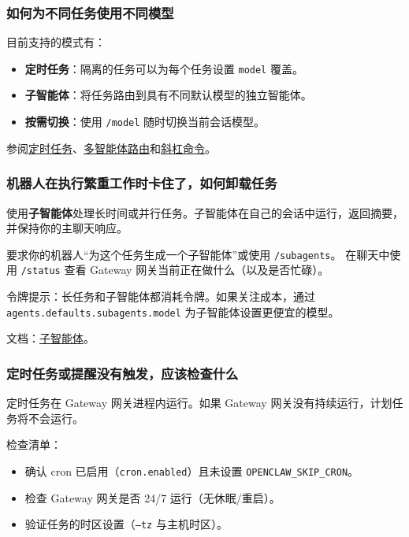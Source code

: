\subsubsection{如何为不同任务使用不同模型}


目前支持的模式有：

\begin{itemize}
  \item \textbf{定时任务}：隔离的任务可以为每个任务设置 \texttt{model} 覆盖。
  \item \textbf{子智能体}：将任务路由到具有不同默认模型的独立智能体。
  \item \textbf{按需切换}：使用 \texttt{/model} 随时切换当前会话模型。
\end{itemize}


参阅\href{/automation/cron-jobs}{定时任务}、\href{/concepts/multi-agent}{多智能体路由}和\href{/tools/slash-commands}{斜杠命令}。

\subsubsection{机器人在执行繁重工作时卡住了，如何卸载任务}


使用\textbf{子智能体}处理长时间或并行任务。子智能体在自己的会话中运行，返回摘要，并保持你的主聊天响应。

要求你的机器人“为这个任务生成一个子智能体”或使用 \texttt{/subagents}。
在聊天中使用 \texttt{/status} 查看 Gateway 网关当前正在做什么（以及是否忙碌）。

令牌提示：长任务和子智能体都消耗令牌。如果关注成本，通过 \texttt{agents.defaults.subagents.model} 为子智能体设置更便宜的模型。

文档：\href{/tools/subagents}{子智能体}。

\subsubsection{定时任务或提醒没有触发，应该检查什么}


定时任务在 Gateway 网关进程内运行。如果 Gateway 网关没有持续运行，计划任务将不会运行。

检查清单：

\begin{itemize}
  \item 确认 cron 已启用（\texttt{cron.enabled}）且未设置 \texttt{OPENCLAW\_SKIP\_CRON}。
  \item 检查 Gateway 网关是否 24/7 运行（无休眠/重启）。
  \item 验证任务的时区设置（\texttt{--tz} 与主机时区）。
\end{itemize}


